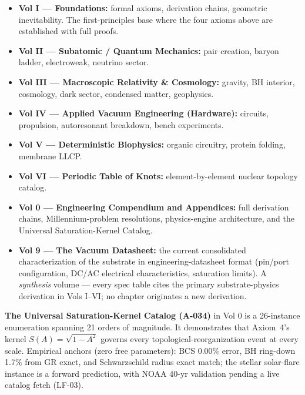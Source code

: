 \begin{itemize}
    \item \textbf{Vol I --- Foundations:} formal axioms, derivation chains, geometric inevitability. The first-principles base where the four axioms above are established with full proofs.
    \item \textbf{Vol II --- Subatomic / Quantum Mechanics:} pair creation, baryon ladder, electroweak, neutrino sector.
    \item \textbf{Vol III --- Macroscopic Relativity \& Cosmology:} gravity, BH interior, cosmology, dark sector, condensed matter, geophysics.
    \item \textbf{Vol IV --- Applied Vacuum Engineering (Hardware):} circuits, propulsion, autoresonant breakdown, bench experiments.
    \item \textbf{Vol V --- Deterministic Biophysics:} organic circuitry, protein folding, membrane LLCP.
    \item \textbf{Vol VI --- Periodic Table of Knots:} element-by-element nuclear topology catalog.
    \item \textbf{Vol 0 --- Engineering Compendium and Appendices:} full derivation chains, Millennium-problem resolutions, physics-engine architecture, and the Universal Saturation-Kernel Catalog.
    \item \textbf{Vol 9 --- The Vacuum Datasheet:} the current consolidated characterization of the substrate in engineering-datasheet format (pin/port configuration, DC/AC electrical characteristics, saturation limits). A \emph{synthesis} volume --- every spec table cites the primary substrate-physics derivation in Vols I--VI; no chapter originates a new derivation.
\end{itemize}

\noindent \textbf{The Universal Saturation-Kernel Catalog (A-034)} in Vol 0 is a 26-instance enumeration spanning 21 orders of magnitude. It demonstrates that Axiom~4's kernel $S(A) = \sqrt{1 - A^2}$ governs every topological-reorganization event at every scale. Empirical anchors (zero free parameters): BCS 0.00\% error, BH ring-down 1.7\% from GR exact, and Schwarzschild radius exact match; the stellar solar-flare instance is a forward prediction, with NOAA 40-yr validation pending a live catalog fetch (LF-03). %

